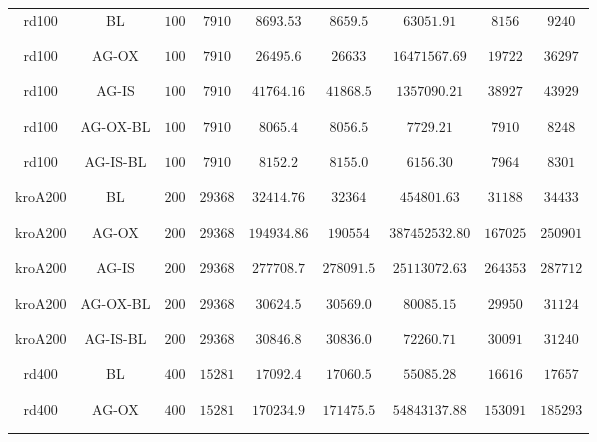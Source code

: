 \begin{table}[H]
{\begin{tabular}{c|cccccccc}
		\midrule 
		rd100 &BL & $100$ & $7910$ & $8693.53$ & $8659.5$ & $63051.91$ & $8156$ & $9240$\\\\\\
		rd100 &AG-OX & $100$ & $7910$ & $26495.6$ & $26633$ & $16471567.69$ & $19722$ & $36297$\\\\\\
		rd100 &AG-IS & $100$ & $7910$ & $41764.16$ & $41868.5$ & $1357090.21$ & $38927$ & $43929$\\\\\\
		rd100 &AG-OX-BL& $100$ & $7910$ & $8065.4$ & $8056.5$ & $7729.21$ & $7910$ & $8248$\\\\\\
		rd100 &AG-IS-BL& $100$ & $7910$ & $8152.2$ & $8155.0$ & $6156.30$ & $7964$ & $8301$\\\\\\
		\midrule 
		kroA200 &BL & $200$ & $29368$ & $32414.76$ & $32364$ & $454801.63$ & $31188$ & $34433$\\\\\\
		kroA200 &AG-OX & $200$ & $29368$ & $194934.86$ & $190554$ & $387452532.80$ & $167025$ & $250901$\\\\\\
		kroA200 &AG-IS & $200$ & $29368$ & $277708.7$ & $278091.5$ & $25113072.63$ & $264353$ & $287712$\\\\\\
		kroA200 &AG-OX-BL& $200$ & $29368$ & $30624.5$ & $30569.0$ & $80085.15$ & $29950$ & $31124$\\\\\\
		kroA200 &AG-IS-BL& $200$ & $29368$ & $30846.8$ & $30836.0$ & $72260.71$ & $30091$ & $31240$\\\\\\
		\midrule 
		rd400 &BL & $400$ & $15281$ & $17092.4$ & $17060.5$ & $55085.28$ & $16616$ & $17657$\\\\\\
		rd400 &AG-OX & $400$ & $15281$ & $170234.9$ & $171475.5$ & $54843137.88$ & $153091$ & $185293$\\\\\\

\end{tabular}}
\end{table}
